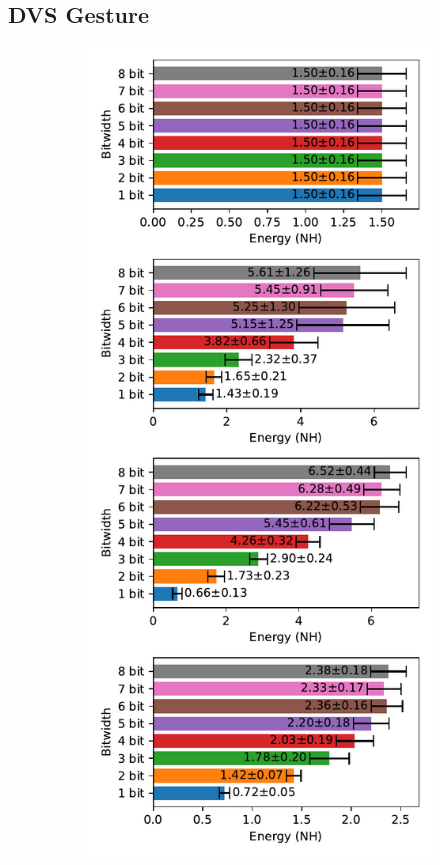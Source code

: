     \subsection{DVS Gesture}
    \label{appendix:energy_neuromorphic_dvs_gesture}

        \begin{figure}[H]
            \centering
            \begin{subfigure}[H]{0.495\textwidth}
                \includegraphics[width=\textwidth]{../standard/DVSGesture/plots/dvsgesture_test_energy_nh.pdf}

\end{subfigure}
\end{figure}
